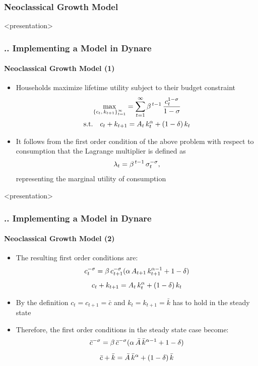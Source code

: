 \documentclass[11pt,aspectratio=169]{beamer}
\begin{document}
\subsubsection{Neoclassical Growth Model}
\begin{frame}<presentation>
\frametitle{{\thesection.\thesubsection.\thesubsubsection} Implementing a Model in Dynare}
\framesubtitle{Neoclassical Growth Model (1)}
	 \begin{itemize}
	 	\item Households maximize lifetime utility subject to their budget constraint 
	 	\begin{gather*}
	 	\underset{\left\{ c_t, \thinspace k_{t+1}\right\} _{t=1}^{\infty}}{\max} = \sum_{t=1}^{\infty} \beta^{\thinspace t-1} \thinspace \frac{c_t^{1-\sigma}}{1-\sigma}\\
	 	\text{s.t.} \quad c_t + k_{t+1} = A_t \thinspace k_t^{\alpha} + (1-\delta) \thinspace k_t
	 	\end{gather*}
	 	\item It follows from the first order condition of the above problem with respect to consumption that the Lagrange multiplier is defined as  $$\lambda_t=\beta^{\thinspace t-1}\thinspace\sigma_t^{-\sigma},$$ representing the marginal utility of consumption
	\end{itemize}
\end{frame}
\begin{frame}<presentation>
\frametitle{{\thesection.\thesubsection.\thesubsubsection} Implementing a Model in Dynare}
\framesubtitle{Neoclassical Growth Model (2)}
	\begin{itemize}
		\item The resulting first order conditions are:
		\begin{gather*}
		c_t^{-\sigma} = \beta \thinspace c_{t+1}^{-\sigma} (\alpha \thinspace A_{t+1} \thinspace k_{t+1}^{\alpha -1} + 1 - \delta)\\[5pt]
		c_t + k_{t+1} = A_t \thinspace k_t^\alpha + (1-\delta) \thinspace k_t
		\end{gather*}
		\item By the definition $c_t=c_{t+1}=\bar{c}$ and $k_t=k_{t+1}=\bar{k}$ has to hold in the \newline steady state
		\item Therefore, the first order conditions in the steady state case become:
		\begin{gather*}
		\bar{c}^{-\sigma} = \beta \thinspace \bar{c}^{-\sigma} (\alpha \thinspace \bar{A} \thinspace \bar{k}^{\alpha -1} + 1 - \delta)\\[5pt]
		\bar{c} + \bar{k} = \bar{A} \thinspace \bar{k}^\alpha + (1-\delta) \thinspace \bar{k}
		\end{gather*}
	\end{itemize}
\end{frame}
\end{document}

